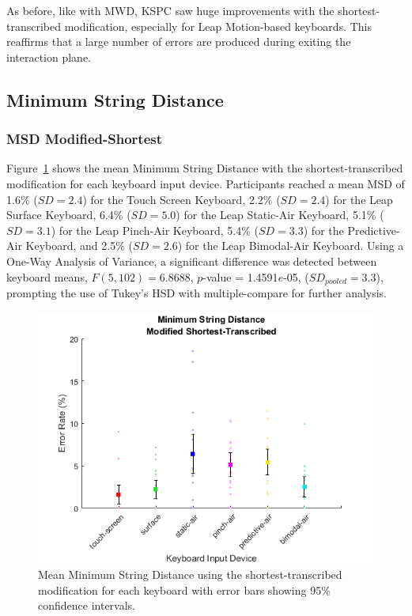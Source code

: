 As before, like with MWD, KSPC saw huge improvements with the shortest-transcribed modification, especially for Leap Motion-based keyboards. This reaffirms that a large number of errors are produced during exiting the interaction plane.

\subsection{Minimum String Distance}

\subsubsection{MSD Modified-Shortest}
Figure~\ref{fig_MSD_short_mean} shows the mean Minimum String Distance with the shortest-transcribed modification for each keyboard input device. Participants reached a mean MSD of 1.6\% ($SD = 2.4$) for the Touch Screen Keyboard, 2.2\% ($SD = 2.4$) for the Leap Surface Keyboard, 6.4\% ($SD = 5.0$) for the Leap Static-Air Keyboard, 5.1\% ($SD = 3.1$) for the Leap Pinch-Air Keyboard, 5.4\% ($SD = 3.3$) for the Predictive-Air Keyboard, and 2.5\% ($SD = 2.6$) for the Leap Bimodal-Air Keyboard. Using a One-Way Analysis of Variance, a significant difference was detected between keyboard means, $F(5, 102) = 6.8688$, $p$-value = 1.4591$e$-05, ($SD_{pooled} = 3.3$), prompting the use of Tukey's HSD with multiple-compare for further analysis.

\begin{figure}[h]
	\centering
	\includegraphics{fig_MSD_short_mean}
	\caption[Mean Minimum String Distance for Modified-Shortest]{Mean Minimum String Distance using the shortest-transcribed modification for each keyboard with error bars showing 95\% confidence intervals.}
	\label{fig_MSD_short_mean}
\end{figure}

